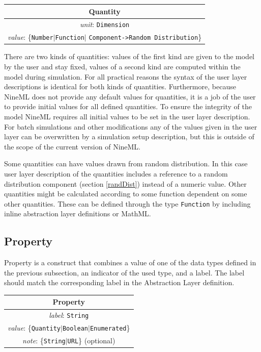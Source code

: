 \documentclass{article}
\begin{document}
\begin{table}[htb]
\center
\begin{tabular}{|c|}
\hline
\hline
Quantity \\
\hline
\hline
{\em unit}: {\tt Dimension} \\
\hline
{\em value}: \{{\tt Number}$|${\tt Function}$|$%
{\tt Component->Random Distribution}\} \\
\hline
\end{tabular}
\end{table}

There are two kinds of quantities: values of the first kind are given to the
model by the user and stay fixed, values of a second kind are computed within
the model during simulation. For all practical reasons the syntax of the user
layer descriptions is identical for both kinds of quantities. Furthermore,
because NineML does not provide any default values for quantities, it is a
job of the user to provide initial values for all defined quantities. To
ensure the integrity of the model NineML requires all initial values to be
set in the user layer description. For batch simulations and other
modifications any of the values given in the user layer can be overwritten
by a simulation setup description, but this is outside of the scope of the
current version of NineML.

Some quantities can have values drawn from random distribution. In this case
user layer description of the quantities includes a reference to a random
distribution component (section \ref{randDist}) instead of a numeric value.
Other quantities might be calculated according to some function dependent on
some other quantities. These can be defined through the type {\tt Function} by
including inline abstraction layer definitions or MathML.

\subsection{Property}

Property is a construct that combines a value of one of the data types
defined in the previous subsection, an indicator of the used type, and a
label. The label should match the corresponding label in the Abstraction
Layer definition.

\begin{table}[htb]
\center
\begin{tabular}{|c|}
\hline
\hline
Property \\
\hline
\hline
{\em label}: {\tt String} \\
\hline
{\em value}: \{{\tt Quantity}$|${\tt Boolean}$|${\tt Enumerated}\} \\
\hline
{\em note}: \{{\tt String}$|${\tt URL}\} (optional)\\
\hline
\end{tabular}
\end{table}
\end{document}
